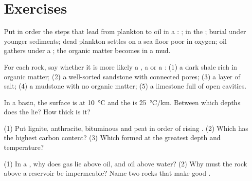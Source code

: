 \section{Exercises}

\begin{exercise}[$\star$]\label{exo:g11:fossil-fuel-geology:1}
Put in order the steps that lead from plankton to oil in a : ;
 in the ; burial under younger sediments; dead plankton
settles on a sea floor poor in oxygen; oil gathers under a ; the organic
matter becomes  in a mud.
\end{exercise}

\begin{exercise}[$\star$]\label{exo:g11:fossil-fuel-geology:2}
For each rock, say whether it is more likely a , a 
or a : (1) a dark shale rich in organic matter; (2) a well-sorted
sandstone with connected pores; (3) a layer of salt; (4) a mudstone with no
organic matter; (5) a limestone full of open cavities.
\end{exercise}

\begin{exercise}[$\star$]\label{exo:g11:fossil-fuel-geology:3}
In a basin, the surface is at \qty{10}{\degreeCelsius} and the  is \qty{25}{\degreeCelsius/km}. Between which depths does the  lie? How thick is it?
\end{exercise}

\begin{exercise}[$\star$]\label{exo:g11:fossil-fuel-geology:4}
(1) Put lignite, anthracite, bituminous  and peat in order of rising
. (2) Which has the highest carbon content? (3) Which formed at the
greatest depth and temperature?
\end{exercise}

\begin{exercise}[$\star$]\label{exo:g11:fossil-fuel-geology:5}
(1) In a , why does gas lie above oil, and oil above water? (2) Why
must the rock above a reservoir be impermeable? Name two rocks that make
good .
\end{exercise}

